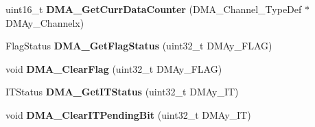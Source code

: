 \begin{DoxyCompactItemize}
\item 
\hypertarget{group__DMA__Exported__Functions_ga511b4c402d1ff32d53f28736956cac5d}{
uint16\_\-t {\bfseries DMA\_\-GetCurrDataCounter} (DMA\_\-Channel\_\-TypeDef $\ast$DMAy\_\-Channelx)}
\label{group__DMA__Exported__Functions_ga511b4c402d1ff32d53f28736956cac5d}

\item 
\hypertarget{group__DMA__Exported__Functions_gafb30b7a891834c267eefd5d30b688a9f}{
FlagStatus {\bfseries DMA\_\-GetFlagStatus} (uint32\_\-t DMAy\_\-FLAG)}
\label{group__DMA__Exported__Functions_gafb30b7a891834c267eefd5d30b688a9f}

\item 
\hypertarget{group__DMA__Exported__Functions_ga25cdca360f309c8ceb7c206cd9ad9119}{
void {\bfseries DMA\_\-ClearFlag} (uint32\_\-t DMAy\_\-FLAG)}
\label{group__DMA__Exported__Functions_ga25cdca360f309c8ceb7c206cd9ad9119}

\item 
\hypertarget{group__DMA__Exported__Functions_ga9287331247150fe84d03ecd7ad8adb52}{
ITStatus {\bfseries DMA\_\-GetITStatus} (uint32\_\-t DMAy\_\-IT)}
\label{group__DMA__Exported__Functions_ga9287331247150fe84d03ecd7ad8adb52}

\item 
\hypertarget{group__DMA__Exported__Functions_ga91a7340e5b334a942f3eb1e05ed5f67a}{
void {\bfseries DMA\_\-ClearITPendingBit} (uint32\_\-t DMAy\_\-IT)}
\label{group__DMA__Exported__Functions_ga91a7340e5b334a942f3eb1e05ed5f67a}

\end{DoxyCompactItemize}
